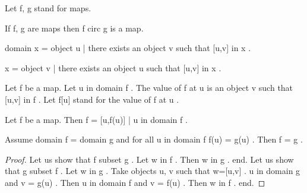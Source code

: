 \documentclass[a4paper,draft]{amsproc}
\begin{document}
\begin{forthel}
Let  f, g  stand for maps.

\begin{theorem}
If  f, g  are maps then  f circ g  is a map.
\end{theorem}

\begin{definition}
 domain x = {object u |   there exists an object  v  such that  [u,v] in x} .
\end{definition}

\begin{definition}
 \range x = {object v |   there exists an object  u  such that  [u,v] in x} .
\end{definition}


\begin{signature}
Let  f  be a map. Let  u in domain f .
The value of  f  at  u  is an object  v  such that  [u,v] in f .
Let  f[u]  stand for the value of  f  at  u .
\end{signature}


\begin{theorem}
Let  f  be a map. Then  f = {[u,f(u)] | u in domain f} .
\end{theorem}

\begin{theorem}
Assume  domain f = domain g  and for all  u in domain f f(u) = g(u) . Then  f = g .
\end{theorem}
\begin{proof}
Let us show that  f subset g .
Let  w in f . 
Then  w in g . end.
Let us show that  g subset f .
Let  w in g .  
Take objects  u, v  such that  w=[u,v] .
 u in domain g  and  v = g(u) .
Then  u in domain f  and  v = f(u) .
Then  w in f . end.
\end{proof}


\end{forthel}
\end{document}
